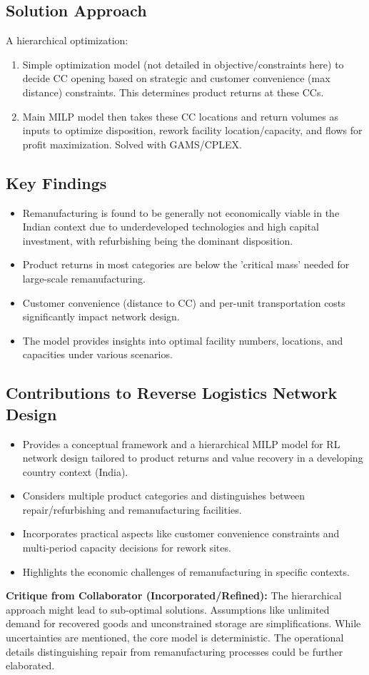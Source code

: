 \subsection*{Solution Approach}
A hierarchical optimization:
\begin{enumerate}
    \item Simple optimization model (not detailed in objective/constraints here) to decide CC opening based on strategic and customer convenience (max distance) constraints. This determines product returns at these CCs.
    \item Main MILP model then takes these CC locations and return volumes as inputs to optimize disposition, rework facility location/capacity, and flows for profit maximization. Solved with GAMS/CPLEX.
\end{enumerate}

\subsection*{Key Findings}
\begin{itemize}
    \item Remanufacturing is found to be generally not economically viable in the Indian context due to underdeveloped technologies and high capital investment, with refurbishing being the dominant disposition.
    \item Product returns in most categories are below the 'critical mass' needed for large-scale remanufacturing.
    \item Customer convenience (distance to CC) and per-unit transportation costs significantly impact network design.
    \item The model provides insights into optimal facility numbers, locations, and capacities under various scenarios.
\end{itemize}

\subsection*{Contributions to Reverse Logistics Network Design}
\begin{itemize}
    \item Provides a conceptual framework and a hierarchical MILP model for RL network design tailored to product returns and value recovery in a developing country context (India).
    \item Considers multiple product categories and distinguishes between repair/refurbishing and remanufacturing facilities.
    \item Incorporates practical aspects like customer convenience constraints and multi-period capacity decisions for rework sites.
    \item Highlights the economic challenges of remanufacturing in specific contexts.
\end{itemize}
\textbf{Critique from Collaborator (Incorporated/Refined):} The hierarchical approach might lead to sub-optimal solutions. Assumptions like unlimited demand for recovered goods and unconstrained storage are simplifications. While uncertainties are mentioned, the core model is deterministic. The operational details distinguishing repair from remanufacturing processes could be further elaborated.